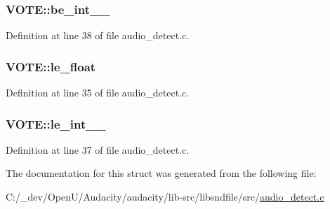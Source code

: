\subsubsection[{\texorpdfstring{be\+\_\+int\+\_\+24\+\_\+32}{be_int_24_32}}]{ V\+O\+T\+E\+::be\+\_\+int\+\_\+\_}\hypertarget{struct_v_o_t_e_aa3646ca2018f0d066cec6d306520d39d}{}\label{struct_v_o_t_e_aa3646ca2018f0d066cec6d306520d39d}


Definition at line 38 of file audio\+\_\+detect.\+c.

\subsubsection[{\texorpdfstring{le\+\_\+float}{le_float}}]{ V\+O\+T\+E\+::le\+\_\+float}\hypertarget{struct_v_o_t_e_a311c0134856f2709bbd312296bca38b2}{}\label{struct_v_o_t_e_a311c0134856f2709bbd312296bca38b2}


Definition at line 35 of file audio\+\_\+detect.\+c.

\subsubsection[{\texorpdfstring{le\+\_\+int\+\_\+24\+\_\+32}{le_int_24_32}}]{ V\+O\+T\+E\+::le\+\_\+int\+\_\+\_}\hypertarget{struct_v_o_t_e_afa8721777a8b8dab0a367e1724c4461b}{}\label{struct_v_o_t_e_afa8721777a8b8dab0a367e1724c4461b}


Definition at line 37 of file audio\+\_\+detect.\+c.



The documentation for this struct was generated from the following file\+:\begin{DoxyCompactItemize}
\item 
C\+:/\+\_\+dev/\+Open\+U/\+Audacity/audacity/lib-\/src/libsndfile/src/\hyperlink{audio__detect_8c}{audio\+\_\+detect.\+c}\end{DoxyCompactItemize}
